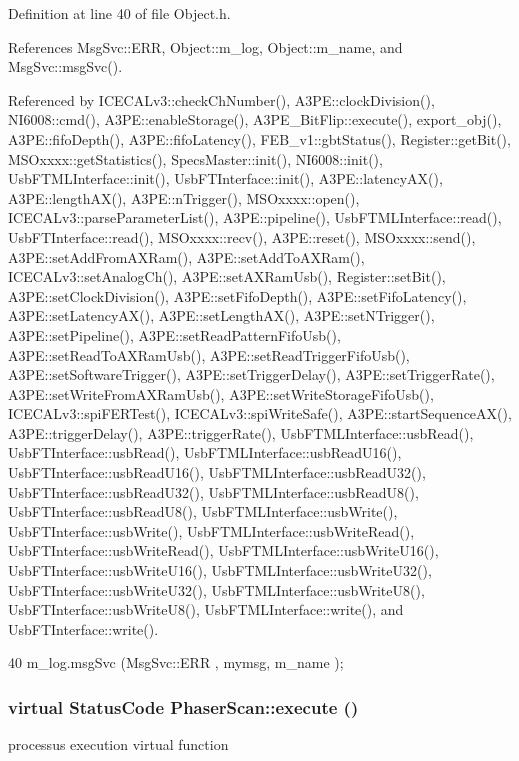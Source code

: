 Definition at line 40 of file Object.h.

References MsgSvc::ERR, Object::m\_\-log, Object::m\_\-name, and MsgSvc::msgSvc().

Referenced by ICECALv3::checkChNumber(), A3PE::clockDivision(), NI6008::cmd(), A3PE::enableStorage(), A3PE\_\-BitFlip::execute(), export\_\-obj(), A3PE::fifoDepth(), A3PE::fifoLatency(), FEB\_\-v1::gbtStatus(), Register::getBit(), MSOxxxx::getStatistics(), SpecsMaster::init(), NI6008::init(), UsbFTMLInterface::init(), UsbFTInterface::init(), A3PE::latencyAX(), A3PE::lengthAX(), A3PE::nTrigger(), MSOxxxx::open(), ICECALv3::parseParameterList(), A3PE::pipeline(), UsbFTMLInterface::read(), UsbFTInterface::read(), MSOxxxx::recv(), A3PE::reset(), MSOxxxx::send(), A3PE::setAddFromAXRam(), A3PE::setAddToAXRam(), ICECALv3::setAnalogCh(), A3PE::setAXRamUsb(), Register::setBit(), A3PE::setClockDivision(), A3PE::setFifoDepth(), A3PE::setFifoLatency(), A3PE::setLatencyAX(), A3PE::setLengthAX(), A3PE::setNTrigger(), A3PE::setPipeline(), A3PE::setReadPatternFifoUsb(), A3PE::setReadToAXRamUsb(), A3PE::setReadTriggerFifoUsb(), A3PE::setSoftwareTrigger(), A3PE::setTriggerDelay(), A3PE::setTriggerRate(), A3PE::setWriteFromAXRamUsb(), A3PE::setWriteStorageFifoUsb(), ICECALv3::spiFERTest(), ICECALv3::spiWriteSafe(), A3PE::startSequenceAX(), A3PE::triggerDelay(), A3PE::triggerRate(), UsbFTMLInterface::usbRead(), UsbFTInterface::usbRead(), UsbFTMLInterface::usbReadU16(), UsbFTInterface::usbReadU16(), UsbFTMLInterface::usbReadU32(), UsbFTInterface::usbReadU32(), UsbFTMLInterface::usbReadU8(), UsbFTInterface::usbReadU8(), UsbFTMLInterface::usbWrite(), UsbFTInterface::usbWrite(), UsbFTMLInterface::usbWriteRead(), UsbFTInterface::usbWriteRead(), UsbFTMLInterface::usbWriteU16(), UsbFTInterface::usbWriteU16(), UsbFTMLInterface::usbWriteU32(), UsbFTInterface::usbWriteU32(), UsbFTMLInterface::usbWriteU8(), UsbFTInterface::usbWriteU8(), UsbFTMLInterface::write(), and UsbFTInterface::write().


\begin{DoxyCode}
40 { m_log.msgSvc (MsgSvc::ERR     , mymsg, m_name ); }
\end{DoxyCode}
\hypertarget{classPhaserScan_abf8e9639bcbbd23ec1a9a8e04319d9d1}{
\subsubsection[{execute}]{\setlength{\rightskip}{0pt plus 5cm}virtual {\bf StatusCode} PhaserScan::execute ()}}
\label{classPhaserScan_abf8e9639bcbbd23ec1a9a8e04319d9d1}
processus execution virtual function 


